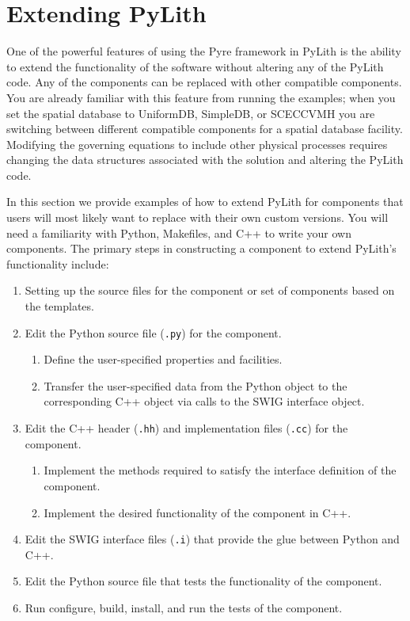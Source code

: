 
\chapter{\label{cha:Extending}Extending PyLith}

One of the powerful features of using the Pyre framework in PyLith
is the ability to extend the functionality of the software without
altering any of the PyLith code. Any of the components can be replaced
with other compatible components. You are already familiar with this
feature from running the examples; when you set the spatial database
to UniformDB, SimpleDB, or SCECCVMH you are switching between different
compatible components for a spatial database facility. Modifying the
governing equations to include other physical processes requires changing
the data structures associated with the solution and altering the
PyLith code.

In this section we provide examples of how to extend PyLith for components
that users will most likely want to replace with their own custom
versions. You will need a familiarity with Python, Makefiles, and
C++ to write your own components. The primary steps in constructing
a component to extend PyLith's functionality include:
\begin{enumerate}
\item Setting up the source files for the component or set of components
based on the templates.
\item Edit the Python source file (\texttt{.py}) for the component.

\begin{enumerate}
\item Define the user-specified properties and facilities.
\item Transfer the user-specified data from the Python object to the corresponding
C++ object via calls to the SWIG interface object.
\end{enumerate}
\item Edit the C++ header (\texttt{.hh}) and implementation files (\texttt{.cc})
for the component.

\begin{enumerate}
\item Implement the methods required to satisfy the interface definition
of the component.
\item Implement the desired functionality of the component in C++.
\end{enumerate}
\item Edit the SWIG interface files (\texttt{.i}) that provide the glue
between Python and C++.
\item Edit the Python source file that tests the functionality of the component.
\item Run configure, build, install, and run the tests of the component.
\end{enumerate}

